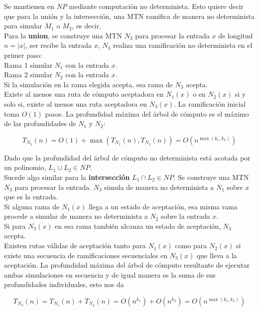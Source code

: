 Se mantienen en $NP$ mediante computación no determinista. Esto quiere decir que para la unión y la intersección, una MTN ramifica de manera no determinista para simular $M_1$ o $M_2$, es decir.\\

Para la \textbf{union}, se construye una MTN $N_3$ para procesar la entrada $x$ de longitud $n = \vert{}x\vert{}$, ser recibe la entrada $x$, $N_3$ realiza una ramificación no determinista en el primer paso:\\

Rama 1 simular $N_1$ con la entrada $x$.\\
Rama 2 simular $N_2$ con la entrada $x$.\\
Si la simulación en la rama elegida acepta, esa rama de $N_3$ acepta.\\

Existe al menos una ruta de cómputo aceptadora en $N_1(x)$ o en $N_2(x)$ si y solo si, existe al menos una ruta aceptadora en $N_3(x)$. La ramificación inicial toma $O(1)$ pasos. La profundidad máxima del árbol de cómputo es el máximo de las profundidades de $N_1$ y $N_2$:

$$T_{N_3}(n) = O(1) + \max(T_{N_1}(n), T_{N_2}(n)) = O(n^{\max(k_1, k_2)})$$

Dado que la profundidad del árbol de cómputo no determinista está acotada por un polinomio, $L_1 \cup L_2 \in NP$.\\

Sucede algo similar para la \textbf{intersección} $L_1 \cap L_2 \in NP$. Se construye una MTN $N_3$ para procesar la entrada. $N_3$ simula de manera no determinista a $N_1$ sobre $x$ que es la entrada.\\

Si alguna rama de $N_1(x)$ llega a un estado de aceptación, esa misma rama procede a simular de manera no determinista a $N_2$ sobre la entrada $x$.\\
Si para $N_2(x)$ en esa rama también alcanza un estado de aceptación, $N_3$ acepta.\\

 Existen rutas válidas de aceptación tanto para $N_1(x)$ como para $N_2(x)$ si existe una secuencia de ramificaciones secuenciales en $N_3(x)$ que lleva a la aceptación. La profundidad máxima del árbol de cómputo resultante de ejecutar ambas simulaciones en secuencia y de igual manera es la suma de sus profundidades individuales, esto nos da
 
 $$T_{N_3}(n) = T_{N_1}(n) + T_{N_2}(n) = O(n^{k_1}) + O(n^{k_2}) = O(n^{\max(k_1, k_2)})$$
 
